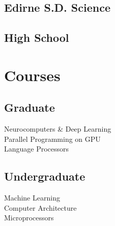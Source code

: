 \documentclass[letterpaper]{deedy-resume} %
\begin{document}
\begin{minipage}[t]{0.33\textwidth}
\sectionspace %

\sectionspace %

\subsection{Edirne S.D. Science}
\subsection{High School}



\sectionspace %


%
%


\section{Courses}

\sectionspace %

\subsection{Graduate}

Neurocomputers \& Deep Learning \\
Parallel Programming on GPU \\
Language Processors \\

\sectionspace %
\sectionspace %

\subsection{Undergraduate}
Machine Learning \\
Computer Architecture \\
Microprocessors\\



\end{minipage}
\end{document}
